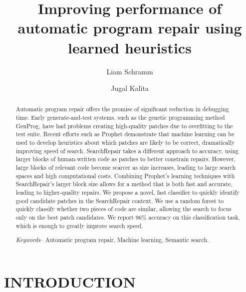 \documentclass[conference]{IEEEtran}
\title{\LARGE \bf
Improving performance of automatic program repair using learned heuristics
}
\author{Liam Schramm}
\affil{Bard College}
\author{Jugal Kalita}
\affil{UCCS}
\begin{document}
\maketitle
\thispagestyle{empty}
\pagestyle{empty}


\begin{abstract}

Automatic program repair offers the promise of significant reduction in debugging time. 
Early generate-and-test systems, such as the genetic programming method GenProg, have had problems creating high-quality patches due to overfitting to the test suite. 
Recent efforts such as Prophet demonstrate that machine learning can be used to develop heuristics about which patches are likely to be correct, dramatically improving speed of search. SearchRepair takes a different approach to accuracy, using larger blocks of human-written code as patches to better constrain repairs. 
However, large blocks of relevant code become scarcer as size increases, leading to large search spaces and high computational costs. 
Combining Prophet's learning techniques with SearchRepair's larger block size allows for a method that is both fast and accurate, leading to higher-quality repairs. 
We propose a novel, fast classifier to quickly identify good candidate patches in the SearchRepair context. 
We use a random forest to quickly classify whether two pieces of code are similar, allowing the search to focus only on the best patch candidates. We report 96\% accuracy on this classification task, which is enough to greatly improve search speed.


\textit{Keywords}-- Automatic program repair, Machine learning, Semantic search.


\end{abstract}




\section{INTRODUCTION}
\end{document}
